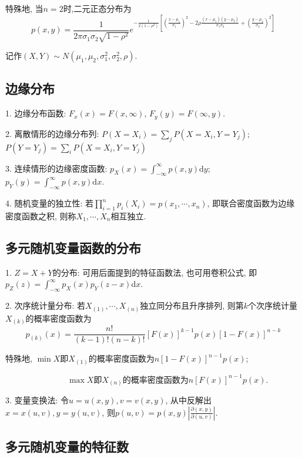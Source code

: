 特殊地, 当$n=2$时,二元正态分布为
\begin{equation*}
    p(x,y)=\frac{1}{2\pi \sigma_1\sigma_2\sqrt{1-\rho^2}}e^{-\frac{1}{2(1-\rho^2)}[(\frac{x-\mu_1}{\sigma_1})^2-2\rho\frac{(x-\mu_1)(y-\mu_2)}{\sigma_1\sigma_2}+(\frac{y-\mu_2}{\sigma_2})^2]}
\end{equation*}

记作$(X,Y)\sim N(\mu_1,\mu_2,\sigma_1^2,\sigma_2^2,\rho)$.

\subsection{边缘分布}

1. 边缘分布函数: $F_x(x)=F(x,\infty)$, $F_y(y)=F(\infty,y)$.

2. 离散情形的边缘分布列: $P(X=X_i)=\sum\limits_j P(X=X_i,Y=Y_j)$; $P(Y=Y_j)=\sum\limits_i P(X=X_i,Y=Y_j)$

3. 连续情形的边缘密度函数: $p_X(x)=\int_{-\infty}^\infty p(x,y) \mathrm{d}y$; $p_Y(y)=\int_{-\infty}^\infty p(x,y) \mathrm{d}x$.

4. 随机变量的独立性: 若$\prod\limits_{i=1}^n p_i(X_i)=p(x_1,\cdots,x_n)$, 即联合密度函数为边缘密度函数之积, 则称$X_1,\cdots, X_n$相互独立.

\subsection{多元随机变量函数的分布}

1. $Z=X+Y$的分布: 可用后面提到的特征函数法, 也可用卷积公式, 即$p_Z(z)=\int_{-\infty}^\infty p_X(x)p_Y(z-x)\mathrm{d}x$.

2. 次序统计量分布: 若$X_{(1)},\cdots,X_{(n)}$独立同分布且升序排列, 则第$k$个次序统计量$X_{(k)}$的概率密度函数为
\begin{equation*}
    p_{(k)}(x)=\frac{n!}{(k-1)!(n-k)!}[F(x)]^{k-1}p(x)[1-F(x)]^{n-k}
\end{equation*}

特殊地, $\min X$即$X_{(1)}$的概率密度函数为$n[1-F(x)]^{n-1}p(x)$; 
    
~~~~~~~~~~~~~~~$\max X$即$X_{(n)}$的概率密度函数为$n[F(x)]^{n-1}p(x)$. 

3. 变量变换法: 令$u=u(x,y), v=v(x,y)$, 从中反解出$x=x(u,v), y=y(u,v)$, 则$p(u,v)=p(x,y)\left|\frac{\partial (x,y)}{\partial(u,v)}\right|$.

\subsection{多元随机变量的特征数}

